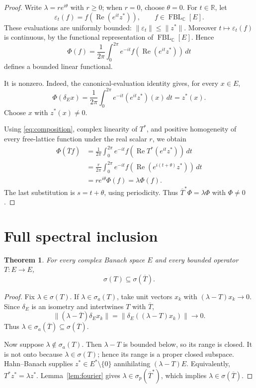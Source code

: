 \documentclass[11pt]{article}
\newtheorem{theorem}{Theorem}
\newcommand{\FBL}{\operatorname{FBL}_{\mathbb C}}
\newcommand{\R}{\mathbb R}
\newcommand{\epsf}{\varepsilon}
\begin{document}
\begin{proof}
Write $\lambda=re^{i\theta}$ with $r\geq0$; when $r=0$, choose $\theta=0$.  For $t\in\R$, let
\[
 \epsf_t(f)=f(\operatorname{Re}(e^{it}z^*)),
 \qquad f\in\FBL[E].
\]
These evaluations are uniformly bounded: $\|\epsf_t\|\leq\|z^*\|$.  Moreover $t\mapsto\epsf_t(f)$ is continuous, by the functional representation of $\FBL[E]$.  Hence
\begin{equation}\label{eq:Phi}
 \Phi(f)=\frac1{2\pi}\int_0^{2\pi}e^{-it}
 f(\operatorname{Re}(e^{it}z^*))\,dt
\end{equation}
defines a bounded linear functional.

It is nonzero.  Indeed, the canonical-evaluation identity gives, for every $x\in E$,
\[
 \Phi(\delta_E x)
 =\frac1{2\pi}\int_0^{2\pi}e^{-it}(e^{it}z^*)(x)\,dt
 =z^*(x).
\]
Choose $x$ with $z^*(x)\neq0$.

Using \eqref{eq:composition}, complex linearity of $T^*$, and positive homogeneity of every free-lattice function under the real scalar $r$, we obtain
\begin{align*}
 \Phi(\overline T f)
 &=\frac1{2\pi}\int_0^{2\pi}e^{-it}
 f(\operatorname{Re}T^*(e^{it}z^*))\,dt\\
 &=\frac r{2\pi}\int_0^{2\pi}e^{-it}
 f(\operatorname{Re}(e^{i(t+\theta)}z^*))\,dt\\
 &=re^{i\theta}\Phi(f)=\lambda\Phi(f).
\end{align*}
The last substitution is $s=t+\theta$, using periodicity.  Thus
$\overline T^*\Phi=\lambda\Phi$ with $\Phi\neq0$.
\end{proof}

\section*{Full spectral inclusion}

\begin{theorem}\label{thm:main}
For every complex Banach space $E$ and every bounded operator $T:E\to E$,
\[
 \sigma(T)\subseteq\sigma(\overline T).
\]
\end{theorem}

\begin{proof}
Fix $\lambda\in\sigma(T)$.  If $\lambda\in\sigma_a(T)$, take unit vectors $x_k$ with $(\lambda-T)x_k\to0$.  Since $\delta_E$ is an isometry and intertwines $T$ with $\overline T$,
\[
 \|(\lambda-\overline T)\delta_E x_k\|
 =\|\delta_E((\lambda-T)x_k)\|\longrightarrow0.
\]
Thus $\lambda\in\sigma_a(\overline T)\subseteq\sigma(\overline T)$.

Now suppose $\lambda\notin\sigma_a(T)$.  Then $\lambda-T$ is bounded below, so its range is closed.  It is not onto because $\lambda\in\sigma(T)$; hence its range is a proper closed subspace.  Hahn--Banach supplies $z^*\in E^*\setminus\{0\}$ annihilating $(\lambda-T)E$.  Equivalently,
$T^*z^*=\lambda z^*$.  Lemma~\ref{lem:fourier} gives
$\lambda\in\sigma_p(\overline T^*)$, which implies
$\lambda\in\sigma(\overline T)$.
\end{proof}
\end{document}

